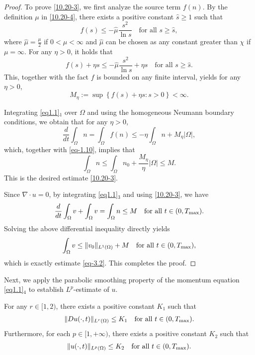 \documentclass[reqno]{amsart}
\begin{document}
\begin{proof} 
To prove \eqref{10.20-3}, we first analyze the source term $f(n)$. By the definition 
$\mu$ in \eqref{10.20-4}, there exists a positive
constant \( \hat{s} \geq 1 \) such that
\begin{equation}\label{eq-3.3}
f(s) \leq - \hat{\mu} \frac{s^2}{\ln s} \quad \text{for all } s \geq \hat{s},
\end{equation}
where $\hat{\mu}  = \frac{\mu}{2}$ if $0 < \mu < \infty$ and $\hat{\mu}$  
can be chosen as any constant greater than $\chi$ if $\mu=\infty$.
For any $\eta>0$, it holds that
\begin{equation}\label{eq3.4}
f(s) + \eta s \leq -\hat{\mu} \frac{s^2}{\ln s} + \eta s \quad 
\text{for all } s \geq \hat{s}.
\end{equation}
This, together with the fact  $f$ is bounded on any finite interval, 
yields for any $\eta>0$,
\[
M_\eta :=  \sup\left\{ f(s) + \eta s : s > 0 \right\} < \infty.
\]

Integrating \eqref{eq1.1}$_1$ over $\Omega$ and using the homogeneous Neumann 
boundary conditions, we obtain that for any $\eta > 0$,
\begin{equation}\label{eq-3.5}
\frac{d}{dt} \int_{\Omega} n = \int_{\Omega} f(n) \leq -\eta \int_{\Omega} n + M_\eta |\Omega|,
\end{equation}
which, together with \eqref{eq-1.10}, implies that
\[
\int_{\Omega} n \leq \int_{\Omega} n_0 + \frac{M_\eta}{\eta} |\Omega| \leq M.
\]
This is the desired estimate \eqref{10.20-3}.

Since $\nabla\cdot u = 0$, by integrating \eqref{eq1.1}$_3$ and using \eqref{10.20-3}, 
we have
\[
\frac{d}{dt}\int_{\Omega} v + \int_{\Omega} v 
= \int_{\Omega} n \leq M \quad \text{for all } t \in (0, T_{\rm max}).
\]
Solving the above differential inequality directly yields
\[
\int_{\Omega} v \leq \|v_0\|_{L^1(\Omega)}+M\quad \text{for all } 
t \in (0, T_{\rm max}),
\]
which is exactly estimate \eqref{eq-3.2}. 
This completes the proof.
\end{proof}

Next, we apply the parabolic smoothing property of the momentum equation 
\eqref{eq1.1}$_4$ to establish $L^p$-estimate of $u$.

\begin{lemma}\label{lm3.2}
For any $ r \in [1, 2) $, there exists a positive constant $K_1$ such that
\begin{align}\label{10.20-1}
\| Du (\cdot, t) \|_{L^r(\Omega)} \leq K_1
\quad \text{for all } t \in (0, T_{\rm max}).
\end{align}
Furthermore, for each $p\in [1,+\infty)$, there exists a positive constant $K_2$ 
such that
\begin{equation}\label{eq3.6}
\|u(\cdot, t)\|_{L^p(\Omega)} \leq K_2 \quad \text{for all } t \in (0, T_{\rm max}).
\end{equation}
\end{lemma}
\end{document}
